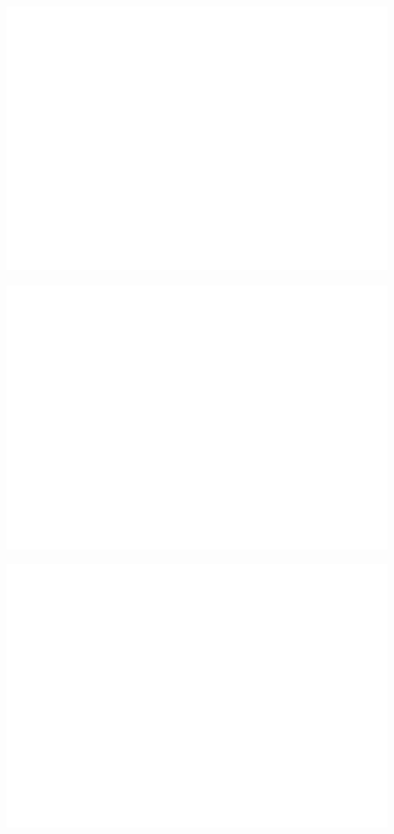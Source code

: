 \documentclass[
]{article}
\begin{document}
\includegraphics{votovalencianista-ea2023_page_files/figure-latex/especificacionesHipotesis1-1.png}

\includegraphics{votovalencianista-ea2023_page_files/figure-latex/especificacionesHipotesis2-1.png}

\includegraphics{votovalencianista-ea2023_page_files/figure-latex/especificacionesHipotesis3-1.png}
\end{document}
